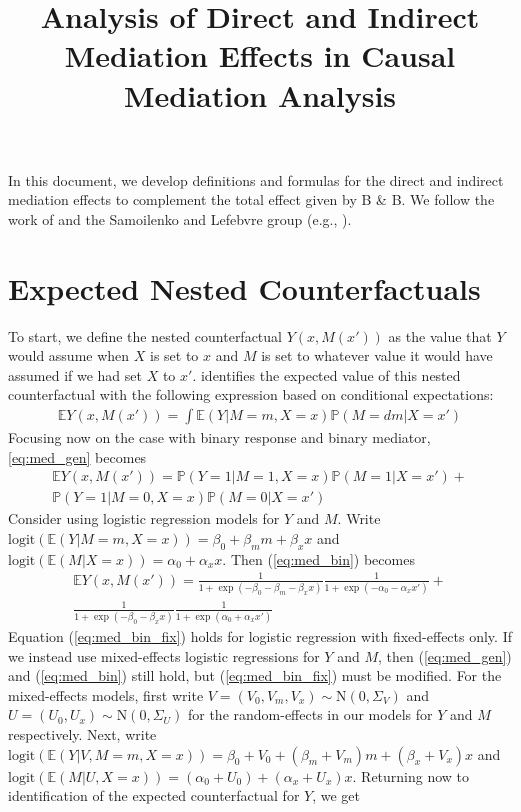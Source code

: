 \documentclass{article}
\title{Analysis of Direct and Indirect Mediation Effects in Causal Mediation Analysis}
\newcommand{\bP}{\mathbb{P}}
\newcommand{\bE}{\mathbb{E}}
\begin{document}
\maketitle

In this document, we develop definitions and formulas for the direct and indirect mediation effects to complement the total effect given by B \& B. We follow the work of \citet{Pea12} and the Samoilenko and Lefebvre group (e.g., \citealp{Sam23}). 

\section{Expected Nested Counterfactuals}
\label{sec:nest_CFs}

To start, we define the nested counterfactual $Y(x, M(x'))$ as the value that $Y$ would assume when $X$ is set to $x$ and $M$ is set to whatever value it would have assumed if we had set $X$ to $x'$. \citet{Pea12} identifies the expected value of this nested counterfactual with the following expression based on conditional expectations:
%
\begin{align}
    \bE Y(x, M(x')) = \int \bE(Y | M=m, X=x) \bP(M = dm | X = x') \label{eq:med_gen}
\end{align}
%
Focusing now on the case with binary response and binary mediator, \ref{eq:med_gen} becomes
%
\begin{multline}
    \bE Y(x, M(x')) = \bP(Y=1 | M=1, X=x) \bP(M=1 | X=x') + \\\bP(Y=1 | M=0, X=x) \bP(M=0 | X=x') \label{eq:med_bin}
\end{multline}
%
Consider using  logistic regression models for $Y$ and $M$. Write $\mathrm{logit}(\bE(Y | M=m, X=x)) = \beta_0 + \beta_m m + \beta_x x$ and $\mathrm{logit}(\bE(M | X=x)) = \alpha_0 + \alpha_x x$. Then (\ref{eq:med_bin}) becomes
%
\begin{multline}
    \bE Y(x, M(x')) = \frac{1}{1 + \exp(-\beta_0 - \beta_m - \beta_x x)} \frac{1}{1 + \exp(-\alpha_0 - \alpha_x x')} +\\
    \frac{1}{1 + \exp(-\beta_0 - \beta_x x)} \frac{1}{1 + \exp(\alpha_0 + \alpha_x x')} \label{eq:med_bin_fix}
\end{multline}
%
Equation (\ref{eq:med_bin_fix}) holds for logistic regression with fixed-effects only. If we instead use  mixed-effects logistic regressions for $Y$ and $M$, then (\ref{eq:med_gen}) and (\ref{eq:med_bin}) still hold, but (\ref{eq:med_bin_fix}) must be modified. For the mixed-effects models, first write $V = (V_0, V_m, V_x) \sim \mathrm{N}(0, \Sigma_V)$ and $U = (U_0, U_x) \sim \mathrm{N}(0, \Sigma_U)$ for the random-effects in our models for $Y$ and $M$ respectively. Next, write $\mathrm{logit}(\bE(Y | V, M=m, X=x)) = \beta_0 + V_0 + (\beta_m + V_m) m + (\beta_x + V_x) x$ and $\mathrm{logit}(\bE(M |U, X=x)) = (\alpha_0 + U_0) + (\alpha_x + U_x) x$. Returning now to identification of the expected counterfactual for $Y$, we get
\end{document}
